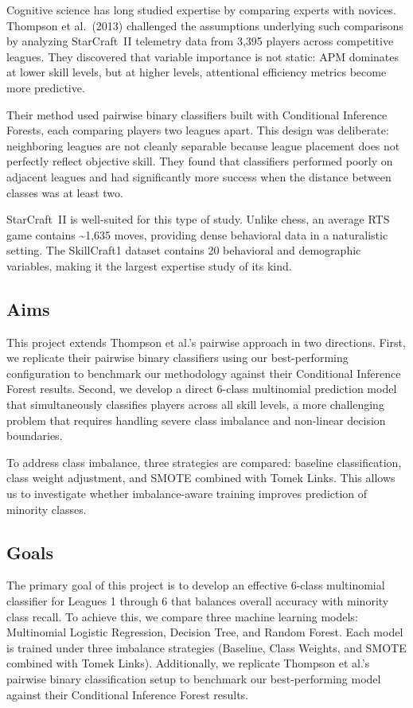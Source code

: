 \documentclass[12pt, a4paper]{article}
\begin{document}
Cognitive science has long studied expertise by comparing experts with novices. Thompson
et al.\ (2013) challenged the assumptions underlying such comparisons by analyzing
StarCraft~II telemetry data from 3,395 players across competitive leagues. They discovered that variable importance is not static: APM dominates at lower skill levels, but at higher levels, attentional efficiency metrics become more predictive.

Their method used pairwise binary classifiers built with Conditional Inference Forests,
each comparing players two leagues apart. This design was deliberate: neighboring leagues
are not cleanly separable because league placement does not perfectly reflect objective
skill. They found that classifiers performed poorly on adjacent leagues and had
significantly more success when the distance between classes was at least two.

StarCraft~II is well-suited for this type of study. Unlike chess, an average RTS game
contains \textasciitilde1,635 moves, providing dense behavioral data in a naturalistic
setting. The SkillCraft1 dataset contains 20 behavioral and demographic variables, making
it the largest expertise study of its kind.

\subsection{Aims}

This project extends Thompson et al.'s pairwise approach in two directions. First, we
replicate their pairwise binary classifiers using our best-performing configuration to
benchmark our methodology against their Conditional Inference Forest results. Second, we develop a direct 6-class multinomial prediction model that simultaneously classifies players across all skill levels, a more challenging problem that requires handling severe class imbalance and non-linear decision boundaries.

To address class imbalance, three strategies are compared: baseline classification,
class weight adjustment, and SMOTE combined with Tomek Links. This allows us to
investigate whether imbalance-aware training improves prediction of minority classes.

\subsection{Goals}

The primary goal of this project is to develop an effective 6-class multinomial
classifier for Leagues 1 through 6 that balances overall accuracy with minority class
recall. To achieve this, we compare three machine learning models: Multinomial Logistic Regression, Decision Tree, and Random Forest. Each model is trained under three imbalance strategies (Baseline, Class Weights, and SMOTE combined with Tomek Links). Additionally, we replicate Thompson et al.'s pairwise binary classification setup to benchmark our best-performing model against their Conditional Inference Forest results.
\end{document}
